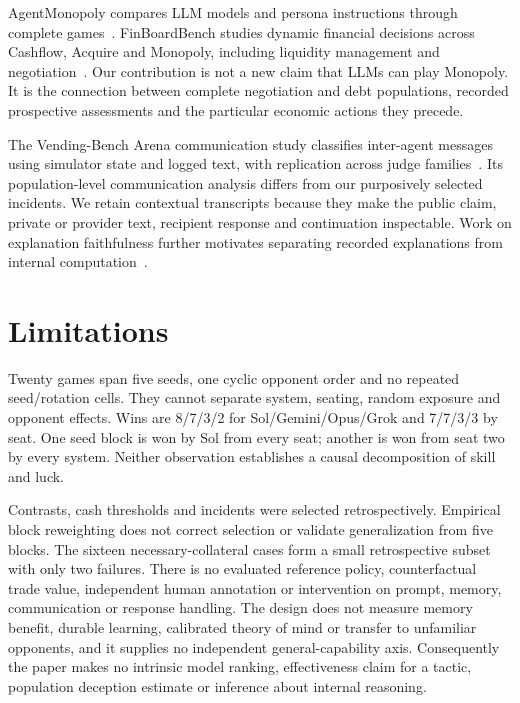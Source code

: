 AgentMonopoly compares LLM models and persona instructions through complete games~\cite{wu2026agentmonopoly}. FinBoardBench studies dynamic financial decisions across Cashflow, Acquire and Monopoly, including liquidity management and negotiation~\cite{hu2026finboardbench}. Our contribution is not a new claim that LLMs can play Monopoly. It is the connection between complete negotiation and debt populations, recorded prospective assessments and the particular economic actions they precede.

The Vending-Bench Arena communication study classifies inter-agent messages using simulator state and logged text, with replication across judge families~\cite{li2026arena}. Its population-level communication analysis differs from our purposively selected incidents. We retain contextual transcripts because they make the public claim, private or provider text, recipient response and continuation inspectable. Work on explanation faithfulness further motivates separating recorded explanations from internal computation~\cite{turpin2023unfaithful,lanham2023faithfulness}.

\section{Limitations}
Twenty games span five seeds, one cyclic opponent order and no repeated seed/rotation cells. They cannot separate system, seating, random exposure and opponent effects. Wins are 8/7/3/2 for Sol/Gemini/Opus/Grok and 7/7/3/3 by seat. One seed block is won by Sol from every seat; another is won from seat two by every system. Neither observation establishes a causal decomposition of skill and luck.

Contrasts, cash thresholds and incidents were selected retrospectively. Empirical block reweighting does not correct selection or validate generalization from five blocks. The sixteen necessary-collateral cases form a small retrospective subset with only two failures. There is no evaluated reference policy, counterfactual trade value, independent human annotation or intervention on prompt, memory, communication or response handling. The design does not measure memory benefit, durable learning, calibrated theory of mind or transfer to unfamiliar opponents, and it supplies no independent general-capability axis. Consequently the paper makes no intrinsic model ranking, effectiveness claim for a tactic, population deception estimate or inference about internal reasoning.

